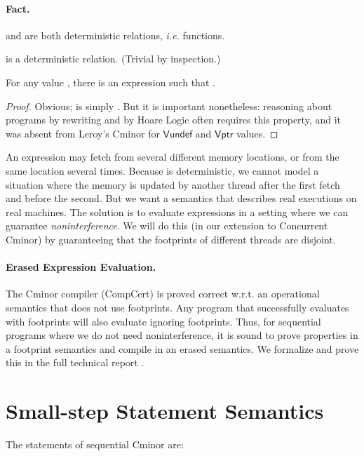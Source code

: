 \documentclass{llncs}
\newcommand{\cminor}{Cminor}
\newcommand{\tyface}[1]{\ensuremath{\mathsf{#1}}}
\newcommand{\Vundef}{\tyface{Vundef}}
\newcommand{\Vptr}{\tyface{Vptr}}
\begin{document}
\paragraph{Fact.} 

and  are both deterministic
relations, \textit{i.e.} functions.


\begin{lemma}

is a deterministic relation. (Trivial by inspection.)
\end{lemma}

\begin{lemma}
For any value , there is an expression  such that
.
\vspace{-3pt}
\begin{proof} 
Obvious;  is simply .
But it is important nonetheless: reasoning about programs by rewriting
and by Hoare Logic often requires this property,
and it was absent from Leroy's \cminor{} for
\Vundef{} and \Vptr{} values.

\end{proof}\end{lemma}



An expression may fetch from several different memory
locations, or from the same location several times.  
Because  is deterministic, we cannot
model a situation where the memory is updated by another thread
after the first fetch and before the second.
But we want a semantics that describes real
executions on real machines.  The solution is to evaluate expressions
in a setting where we can guarantee \emph{noninterference}.
We will do this (in our extension to Concurrent \cminor)
by guaranteeing that the footprints  of different
threads are disjoint.



\paragraph{Erased Expression Evaluation.}
The \cminor{} compiler (CompCert) is proved correct w.r.t. an operational semantics that does not use
footprints.
Any program that successfully evaluates with footprints will also evaluate ignoring footprints.
Thus, for sequential programs where we do not need noninterference,
it is sound to prove properties in a footprint semantics and compile in an erased semantics.  We formalize and prove this in the full technical report \cite{appel07:tr}.

\section{Small-step Statement Semantics}
The statements of sequential \cminor{} are:
\end{document}
